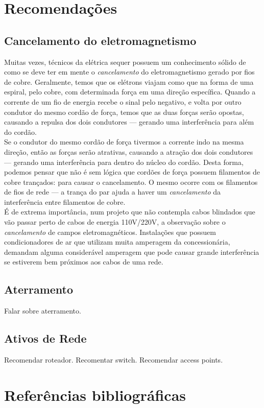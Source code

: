 \documentclass[	DIV=calc,%
							paper=a4,%
							fontsize=12pt,%
							onecolumn]{scrartcl}	 					%
\begin{document}
\pagebreak

\section{Recomendações}

\subsection{Cancelamento do eletromagnetismo}

Muitas vezes, técnicos da elétrica sequer possuem um conhecimento sólido de como se deve ter em mente o \textit{cancelamento} do eletromagnetismo gerado por fios de cobre. Geralmente, temos que os elétrons viajam como que na forma de uma espiral, pelo cobre, com determinada força em uma direção específica. Quando a corrente de um fio de energia recebe o sinal pelo negativo, e volta por outro condutor do mesmo cordão de força, temos que as duas forças serão opostas, causando a repulsa dos dois condutores --- gerando uma interferência para além do cordão. 
\\

Se o condutor do mesmo cordão de força tivermos a corrente indo na mesma direção, então as forças serão atrativas, causando a atração dos dois condutores --- gerando uma interferência para dentro do núcleo do cordão. Desta forma, podemos pensar que não é sem lógica que cordões de força possuem filamentos de cobre trançados: para causar o cancelamento. O mesmo ocorre com os filamentos de fios de rede --- a trança do par ajuda a haver um \textit{cancelamento} da interferência entre filamentos de cobre.
\\

É de extrema importância, num projeto que não contempla cabos blindados  que vão passar perto de cabos de energia 110V/220V, a observação sobre o \textit{cancelamento} de campos eletromagnéticos. Instalações que possuem condicionadores de ar que utilizam muita amperagem da concessionária, demandam alguma considerável amperagem que pode causar grande interferência se estiverem bem próximos aos cabos de uma rede.  
\\

\subsection{Aterramento}

Falar sobre aterramento. 

\subsection{Ativos de Rede}

Recomendar roteador.
Recomentar switch.
Recomendar access points.

\pagebreak
\section{Referências bibliográficas}


\renewcommand\refname{} %

  
\end{document}

